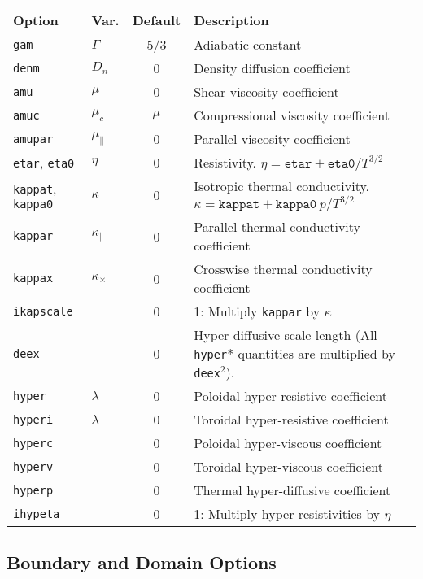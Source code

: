 \documentclass[letterpaper]{book}
\begin{document}
\begin{tabular}{llcp{2.2in}}
  \textbf{Option}&\textbf{Var.}&\textbf{Default}&\textbf{Description}\\
  \hline
  \texttt{gam}    & $\Gamma$& 5/3 & Adiabatic constant\\
  \texttt{denm}   & $D_n$   & 0   & Density diffusion coefficient\\
  \texttt{amu}    & $\mu$   & 0   & Shear viscosity coefficient\\
  \texttt{amuc}   & $\mu_c$ &$\mu$& Compressional viscosity coefficient\\
  \texttt{amupar} & $\mu_\parallel$ & 0 & Parallel viscosity coefficient\\
  \texttt{etar}, \texttt{eta0}
                  & $\eta$  & 0   & Resistivity.  
                  $\eta = \mathtt{etar} + \mathtt{eta0}/T^{3/2}$\\
  \texttt{kappat}, \texttt{kappa0}
                  & $\kappa$& 0   & Isotropic thermal conductivity.
                  $\kappa = \mathtt{kappat} + \mathtt{kappa0}\ p/T^{3/2}$\\
  \texttt{kappar} & $\kappa_\parallel$ & 0 
                  & Parallel thermal conductivity coefficient\\ 
  \texttt{kappax} & $\kappa_\times$ & 0 
                  & Crosswise thermal conductivity coefficient\\ 
  \texttt{ikapscale}& & 0 & 1: Multiply \texttt{kappar} by $\kappa$\\
  \texttt{deex}   & & 0 & Hyper-diffusive scale length
    (All \texttt{hyper}* quantities are multiplied by \texttt{deex}$^2$).\\
  \texttt{hyper}  & $\lambda$ & 0 & Poloidal hyper-resistive coefficient\\
  \texttt{hyperi} & $\lambda$ & 0 & Toroidal hyper-resistive coefficient\\
  \texttt{hyperc} & & 0 & Poloidal hyper-viscous coefficient\\
  \texttt{hyperv} & & 0 & Toroidal hyper-viscous coefficient\\
  \texttt{hyperp} & & 0 & Thermal hyper-diffusive coefficient\\
  \texttt{ihypeta}& & 0 & 1: Multiply hyper-resistivities by $\eta$
\end{tabular}



\subsection{Boundary and Domain Options}
\end{document}
